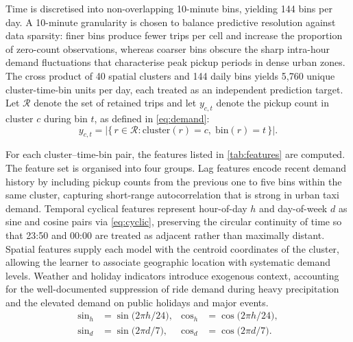 \documentclass[a4paper,fleqn]{cas-dc}
\begin{document}
Time is discretised into non-overlapping 10-minute bins, yielding 144 bins per day.  A 10-minute granularity is chosen to balance predictive resolution against data sparsity: finer bins produce fewer trips per cell and increase the proportion of zero-count observations, whereas coarser bins obscure the sharp intra-hour demand fluctuations that characterise peak pickup periods in dense urban zones.  The cross product of 40 spatial clusters and 144 daily bins yields 5,760 unique cluster-time-bin units per day, each treated as an independent prediction target.  Let $\mathcal{R}$ denote the set of retained trips and let $y_{c,t}$ denote the pickup count in cluster $c$ during bin $t$, as defined in \eqref{eq:demand}:
\begin{equation}
  y_{c,t} = \bigl|\{\, r \in \mathcal{R} : \mathrm{cluster}(r)=c,\; \mathrm{bin}(r)=t \,\}\bigr|.
  \label{eq:demand}
\end{equation}

For each cluster--time-bin pair, the features listed in \autoref{tab:features} are computed.  The feature set is organised into four groups.  Lag features encode recent demand history by including pickup counts from the previous one to five bins within the same cluster, capturing short-range autocorrelation that is strong in urban taxi demand.  Temporal cyclical features represent hour-of-day $h$ and day-of-week $d$ as sine and cosine pairs via \eqref{eq:cyclic}, preserving the circular continuity of time so that 23:50 and 00:00 are treated as adjacent rather than maximally distant.  Spatial features supply each model with the centroid coordinates of the cluster, allowing the learner to associate geographic location with systematic demand levels.  Weather and holiday indicators introduce exogenous context, accounting for the well-documented suppression of ride demand during heavy precipitation and the elevated demand on public holidays and major events.
\begin{equation}
  \begin{aligned}
    \sin_h &= \sin\!\bigl(2\pi h/24\bigr), &
    \cos_h &= \cos\!\bigl(2\pi h/24\bigr), \\
    \sin_d &= \sin\!\bigl(2\pi d/7\bigr), &
    \cos_d &= \cos\!\bigl(2\pi d/7\bigr).
  \end{aligned}
  \label{eq:cyclic}
\end{equation}
\end{document}
